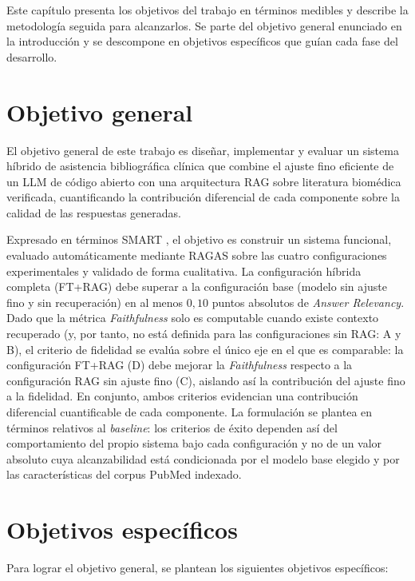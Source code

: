\documentclass[11pt,a4paper,spanish]{book}
\numberwithin{equation}{chapter}
\numberwithin{figure}{chapter}
\begin{document}
Este capítulo presenta los objetivos del trabajo en términos medibles y describe la metodología seguida para alcanzarlos. Se parte del objetivo general enunciado en la introducción y se descompone en objetivos específicos que guían cada fase del desarrollo.

\section{Objetivo general}

El objetivo general de este trabajo es diseñar, implementar y evaluar un sistema híbrido de asistencia bibliográfica clínica que combine el ajuste fino eficiente de un LLM de código abierto con una arquitectura RAG sobre literatura biomédica verificada, cuantificando la contribución diferencial de cada componente sobre la calidad de las respuestas generadas.

Expresado en términos SMART \cite{doran1981there}, el objetivo es construir un sistema funcional, evaluado automáticamente mediante RAGAS sobre las cuatro configuraciones experimentales y validado de forma cualitativa. La configuración híbrida completa (FT+RAG) debe superar a la configuración base (modelo sin ajuste fino y sin recuperación) en al menos $0{,}10$ puntos absolutos de \textit{Answer Relevancy}. Dado que la métrica \textit{Faithfulness} solo es computable cuando existe contexto recuperado (y, por tanto, no está definida para las configuraciones sin RAG: A y B), el criterio de fidelidad se evalúa sobre el único eje en el que es comparable: la configuración FT+RAG (D) debe mejorar la \textit{Faithfulness} respecto a la configuración RAG sin ajuste fino (C), aislando así la contribución del ajuste fino a la fidelidad. En conjunto, ambos criterios evidencian una contribución diferencial cuantificable de cada componente. La formulación se plantea en términos relativos al \textit{baseline}: los criterios de éxito dependen así del comportamiento del propio sistema bajo cada configuración y no de un valor absoluto cuya alcanzabilidad está condicionada por el modelo base elegido y por las características del corpus PubMed indexado.

\section{Objetivos específicos}

Para lograr el objetivo general, se plantean los siguientes objetivos específicos:
\end{document}
